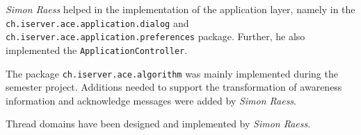 \emph{Simon Raess} helped in the implementation of the application layer, namely in the \texttt{ch.\-iserver.\-ace.\-application.\-dialog} and 
\texttt{ch.\-iserver.\-ace.\-application.\-preferences} package. Further,
he also implemented the \texttt{Application\-Controller}.

The package \texttt{ch.iserver.ace.algorithm} was mainly implemented during
the semester project. Additions needed to support the transformation of
awareness information and acknowledge messages were added by \emph{Simon Raess}.

Thread domains have been designed and implemented by \emph{Simon Raess}.
